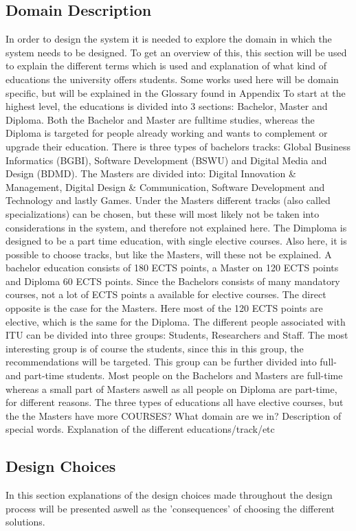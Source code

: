 \subsection{Domain Description}
In order to design the system it is needed to explore the domain in which the system needs to be designed. To get an overview of this, this section will be used to explain the different terms which is used and explanation of what kind of educations the university offers students. Some works used here will be domain specific, but will be explained in the Glossary found in Appendix 
To start at the highest level, the educations is divided into 3 sections: Bachelor, Master and Diploma. Both the Bachelor and Master are fulltime studies, whereas the Diploma is targeted for people already working and wants to complement or upgrade their education. There is three types of bachelors tracks: Global Business Informatics (BGBI), Software Development (BSWU) and Digital Media and Design (BDMD). The Masters are divided into: Digital Innovation \& Management, Digital Design \& Communication, Software Development and Technology and lastly Games. Under the Masters different tracks (also called specializations) can be chosen, but these will most likely not be taken into considerations in the system, and therefore not explained here. The Dimploma is designed to be a part time education, with single elective courses. Also here, it is possible to choose tracks, but like the Masters, will these not be explained. 
A bachelor education consists of 180 ECTS points, a Master on 120 ECTS points and Diploma 60 ECTS points. Since the Bachelors consists of many mandatory courses, not a lot of ECTS points a available for elective courses. The direct opposite is the case for the Masters. Here most of the 120 ECTS points are elective, which is the same for the Diploma. 
The different people associated with ITU can be divided into three groups: Students, Researchers and Staff. The most interesting group is of course the students, since this in this group, the recommendations will be targeted. This group can be further divided into full- and part-time students. Most people on the Bachelors and Masters are full-time whereas a small part of Masters aswell as all people on Diploma are part-time, for different reasons. 
The three types of educations all have elective courses, but the the Masters have more 
COURSES?
What domain are we in? Description of special words. Explanation of the different educations/track/etc

\subsection{Design Choices}
In this section explanations of the design choices made throughout the design process will be presented aswell as the 'consequences' of choosing the different solutions. 
